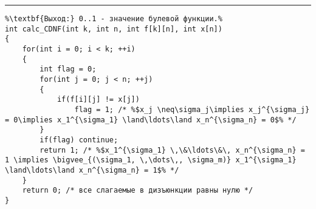 \vspace{5pt} \hrule
\begin{lstlisting}[caption={Алгоритм вычисления значения СДНФ}, label=p_137, escapechar=\%]
%\noindent\textbf{Вход:} массив, представляющий СДНФ: f: \textbf{array} [1..k,1..n] \textbf{of} 0..1; множество значений переменных x: \textbf{array} [1..n] \textbf{of} 0..1.\\%
%\textbf{Выход:} 0..1 - значение булевой функции.%
int calc_CDNF(int k, int n, int f[k][n], int x[n])
{
	for(int i = 0; i < k; ++i)
	{
		int flag = 0;
		for(int j = 0; j < n; ++j)
		{
			if(f[i][j] != x[j])
				flag = 1; /* %$x_j \neq\sigma_j\implies x_j^{\sigma_j} = 0\implies x_1^{\sigma_1} \land\ldots\land x_n^{\sigma_n} = 0$% */
		}
		if(flag) continue;
		return 1; /* %$x_1^{\sigma_1} \,\&\ldots\&\, x_n^{\sigma_n} = 1 \implies \bigvee_{(\sigma_1, \,\dots\,, \sigma_m)} x_1^{\sigma_1} \land\ldots\land x_n^{\sigma_n} = 1$% */
	}
	return 0; /* все слагаемые в дизъюнкции равны нулю */
}
\end{lstlisting}
